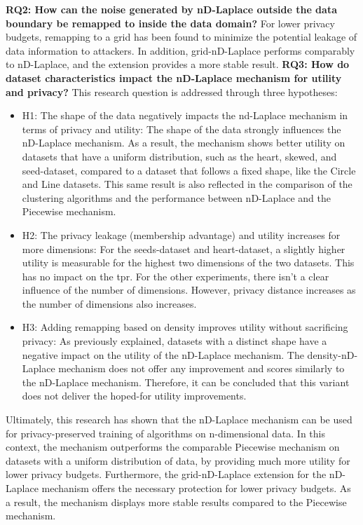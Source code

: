 \textbf{RQ2: How can the noise generated by nD-Laplace outside the data boundary be remapped to inside the data domain?} \newline
For lower privacy budgets, remapping to a grid has been found to minimize the potential leakage of data information to attackers.
In addition, grid-nD-Laplace performs comparably to nD-Laplace, and the extension provides a more stable result.
\textbf{RQ3: How do dataset characteristics impact the nD-Laplace mechanism for utility and privacy?} \newline
This research question is addressed through three hypotheses: \newline
\begin{itemize}
	\item H1: The shape of the data negatively impacts the nd-Laplace mechanism in terms of privacy and utility:
	The shape of the data strongly influences the nD-Laplace mechanism.
        As a result, the mechanism shows better utility on datasets that have a uniform distribution, such as the heart, skewed, and seed-dataset, compared to a dataset that follows a fixed shape, like the Circle and Line datasets.
        This same result is also reflected in the comparison of the clustering algorithms and the performance between nD-Laplace and the Piecewise mechanism.
	\item H2: The privacy leakage (membership advantage) and utility increases for more dimensions:
	      For the seeds-dataset and heart-dataset, a slightly higher utility is measurable for the highest two dimensions of the two datasets. 
       This has no impact on the \gls{tpr}.
            For the other experiments, there isn't a clear influence of the number of dimensions. However, privacy distance increases as the number of dimensions also increases.
	\item H3: Adding remapping based on density improves utility without sacrificing privacy:
	      As previously explained, datasets with a distinct shape have a negative impact on the utility of the nD-Laplace mechanism.
            The density-nD-Laplace mechanism does not offer any improvement and scores similarly to the nD-Laplace mechanism. 
            Therefore, it can be concluded that this variant does not deliver the hoped-for utility improvements.
\end{itemize}

Ultimately, this research has shown that the nD-Laplace mechanism can be used for privacy-preserved training of algorithms on n-dimensional data.
In this context, the mechanism outperforms the comparable Piecewise mechanism on datasets with a uniform distribution of data, by providing much more utility for lower privacy budgets.
Furthermore, the grid-nD-Laplace extension for the nD-Laplace mechanism offers the necessary protection for lower privacy budgets. As a result, the mechanism displays more stable results compared to the Piecewise mechanism. \newline

